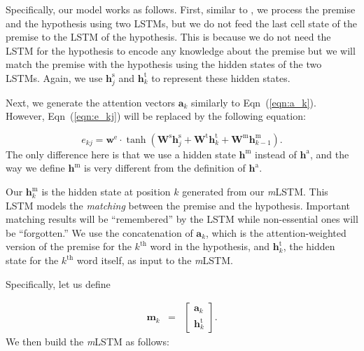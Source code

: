 \documentclass[11pt,letterpaper]{article}
\begin{document}
Specifically, our model works as follows.
First, similar to , we process the premise and the hypothesis using two LSTMs, but we do not feed the last cell state of the premise to the LSTM of the hypothesis.
This is because we do not need the LSTM for the hypothesis to encode any knowledge about the premise but we will match the premise with the hypothesis using the hidden states of the two LSTMs.
Again, we use $\mathbf{h}^\text{s}_j$ and $\mathbf{h}^\text{t}_k$ to represent these hidden states.

Next, we generate the attention vectors $\mathbf{a}_k$ similarly to Eqn~(\ref{eqn:a_k}).
However, Eqn~(\ref{eqn:e_kj}) will be replaced by the following equation:

\small
\begin{equation}
e_{kj} = \mathbf{w}^\text{e} \cdot \tanh(\mathbf{W}^\text{s} \mathbf{h}^\text{s}_j + \mathbf{W}^\text{t} \mathbf{h}^\text{t}_k + \mathbf{W}^\text{m} \mathbf{h}^\text{m}_{k-1}).
\end{equation}
\normalsize
The only difference here is that we use a hidden state $\mathbf{h}^\text{m}$ instead of $\mathbf{h}^\text{a}$, and the way we define $\mathbf{h}^\text{m}$ is very different from the definition of $\mathbf{h}^\text{a}$.

Our $\mathbf{h}^\text{m}_k$ is the hidden state at position $k$ generated from our \emph{m}LSTM.
This LSTM models the \emph{matching} between the premise and the hypothesis.
Important matching results will be ``remembered'' by the LSTM while non-essential ones will be ``forgotten.''
We use the concatenation of $\mathbf{a}_k$, which is the attention-weighted version of the premise for the $k^{\mathrm{th}}$ word in the hypothesis, and $\mathbf{h}^\text{t}_k$, the hidden state for the $k^{\mathrm{th}}$ word itself, as input to the \emph{m}LSTM.

Specifically, let us define

\small
\begin{eqnarray}
\mathbf{m}_k & = & \begin{bmatrix}
\mathbf{a}_k \\
\mathbf{h}^\text{t}_k
\end{bmatrix}.
\end{eqnarray}
\normalsize
We then build the \emph{m}LSTM as follows:
\end{document}
